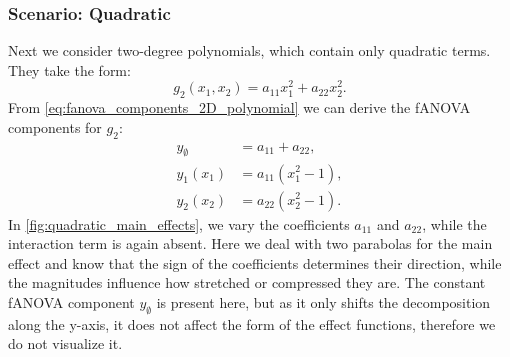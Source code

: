 \subsubsection*{Scenario: Quadratic}
Next we consider two-degree polynomials, which contain only quadratic terms. They take the form: $$g_2(x_1, x_2) = a_{11} x_1^2 + a_{22} x_2^2.$$
From \autoref{eq:fanova_components_2D_polynomial} we can derive the fANOVA components for $g_2$:
\begin{align*}
    y_{\emptyset} &= a_{11} + a_{22}, \\
    y_1(x_1) &= a_{11}(x_1^2 - 1), \\
    y_2(x_2) &= a_{22}(x_2^2 - 1).
\end{align*}
In \autoref{fig:quadratic_main_effects}, we vary the coefficients $a_{11}$ and $a_{22}$, while the interaction term is again absent.
Here we deal with two parabolas for the main effect and know that the sign of the coefficients determines their direction, while the magnitudes influence how stretched or compressed they are. The constant fANOVA component $y_{\emptyset}$ is present here, but as it only shifts the decomposition along the y-axis, it does not affect the form of the effect functions, therefore we do not visualize it.

